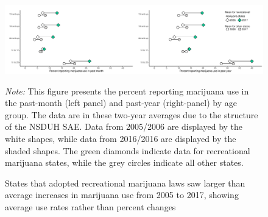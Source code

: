 \documentclass[12pt]{article}%
\begin{document}
\begin{landscape}
    \begin{figure}[H]
        \caption{States that adopted recreational marijuana laws saw larger than average increases in marijuana use from 2005 to 2017, showing average use rates rather than percent changes}
        \begin{minipage}{\linewidth}
            \includegraphics[width=\linewidth]{../output/plots/change-in-use-raw-data.pdf}
            \begin{justify}
            {\footnotesize
             \emph{Note:} 
            This figure presents the percent reporting marijuana use in the past-month (left panel) and past-year (right-panel) by age group. 
            The data are in these two-year averages due to the structure of the NSDUH SAE.   
            Data from 2005/2006 are displayed by the white shapes, while data from 2016/2016 are displayed by the shaded shapes.
            The green diamonds indicate data for recreational marijuana states, while the grey circles indicate all other states. 
                    \par}
                \end{justify}
        \end{minipage}
        \label{fig:change-in-mj-use-raw-data}
\end{figure}

    \end{landscape}
\end{document}
